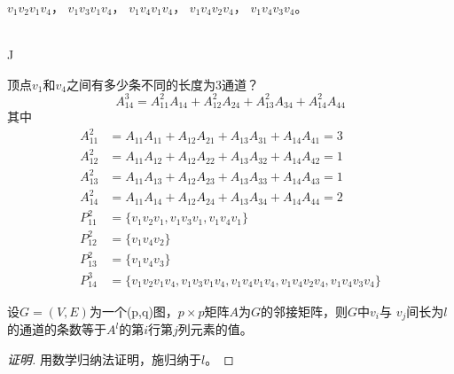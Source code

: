 \documentclass{beamer}
\begin{document}
\begin{CJK*}{UTF8}{gbsn}
\begin{frame}
\begin{minipage}{0.75\linewidth}
  $v_1v_2v_1v_4$， $v_1v_3v_1v_4$， $v_1v_4v_1v_4$， $v_1v_4v_2v_4$， $v_1v_4v_3v_4$。
\end{minipage}
\end{frame}
\begin{frame}
    \begin{minipage}{0.24\linewidth}
    \centering
      \\
 \vspace*{0.3cm}
 J
\end{minipage}
\begin{minipage}{0.75\linewidth}
  顶点$v_1$和$v_4$之间有多少条不同的长度为$3$通道？
  \begin{equation*}
    A^3_{14} = A^2_{11}A_{14} + A^2_{12}A_{24} + A^2_{13}A_{34} + A^2_{14}A_{44}
  \end{equation*}
  其中
  \begin{align*}
    A^2_{11}&=A_{11}A_{11} + A_{12}A_{21} + A_{13}A_{31} + A_{14}A_{41}=3\\
    A^2_{12}&=A_{11}A_{12} + A_{12}A_{22} + A_{13}A_{32} + A_{14}A_{42}=1\\
    A^2_{13}&=A_{11}A_{13} + A_{12}A_{23} + A_{13}A_{33} + A_{14}A_{43}=1\\
    A^2_{14}&=A_{11}A_{14} + A_{12}A_{24} + A_{13}A_{34} + A_{14}A_{44}=2\\
    P^2_{11}&=\{v_1v_2v_1,v_1v_3v_1,v_1v_4v_1\}\\
    P^2_{12}&=\{v_1v_4v_2\}\\
    P^2_{13}&=\{v_1v_4v_3\}\\
    P^3_{14}&=\{v_1v_2v_1v_4,v_1v_3v_1v_4,v_1v_4v_1v_4,v_1v_4v_2v_4,v_1v_4v_3v_4\}
  \end{align*}
\end{minipage}
\end{frame}

\begin{frame}
    \begin{Thm}
    设$G=(V,E)$为一个(p,q)图，$p\times p$矩阵$A$为$G$的邻接矩阵，则$G$中$v_i$与
    $v_j$间长为$l$的通道的条数等于$A^l$的第$i$行第$j$列元素的值。
  \end{Thm}
  \begin{proof}[证明]
      用数学归纳法证明，施归纳于$l$。


\end{proof}
\end{frame}
\end{CJK*}
\end{document}
